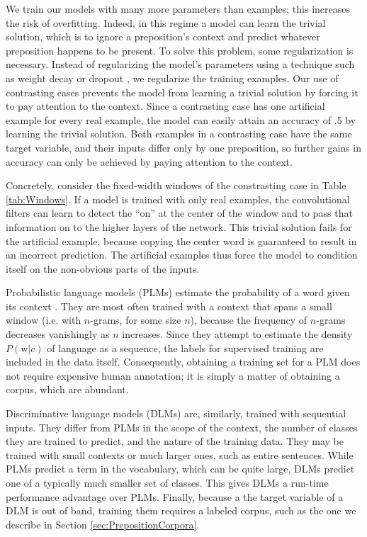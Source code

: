 We train our models with many more parameters than examples; this increases the risk of overfitting.  Indeed, in this regime a model can learn the trivial solution, which is to ignore a preposition's context and predict whatever preposition happens to be present.  To solve this problem, some regularization is necessary.  Instead of regularizing the model's parameters using a technique such as weight decay or dropout \cite{hinton2012improving}, we regularize the training examples.  Our use of contrasting cases prevents the model from learning a trivial solution by forcing it to pay attention to the context.  Since a contrasting case has one artificial example for every real example, the model can easily attain an accuracy of .5 by learning the trivial solution.  Both examples in a contrasting case have the same target variable, and their inputs differ only by one preposition, so further gains in accuracy can only be achieved by paying attention to the context.

Concretely, consider the fixed-width windows of the constrasting case in Table \ref{tab:Windows}.  If a model is trained with only real examples, the convolutional filters can learn to detect the ``on'' at the center of the window and to pass that information on to the higher layers of the network.  This trivial solution fails for the artificial example, because copying the center word is guaranteed to result in an incorrect prediction.  The artificial examples thus force the model to condition itself on the non-obvious parts of the inputs. 

\iffalse
Probabilistic language models (PLMs) estimate the probability of a word given its context .  They are most often trained with a context that spans a small window (i.e. with $n$-grams, for some size $n$), because the frequency of $n$-grams decreases vanishingly as $n$ increases.  Since they attempt to estimate the density $P(\text{w}|c)$ of language as a sequence, the labels for supervised training are included in the data itself.  Consequently, obtaining a training set for a PLM does not require expensive human annotation; it is simply a matter of obtaining a corpus, which are abundant.

Discriminative language models (DLMs) are, similarly, trained with sequential inputs.  They differ from PLMs in the scope of the context, the number of classes they are trained to predict, and the nature of the training data.  They may be trained with small contexts or much larger ones, such as entire sentences.  While PLMs predict a term in the vocabulary, which can be quite large, DLMs predict one of a typically much smaller set of classes.  This gives DLMs a run-time performance advantage over PLMs.   Finally, because a the target variable of a DLM is out of band, training them requires a labeled corpus, such as the one we describe in Section \ref{sec:PrepositionCorpora}.


